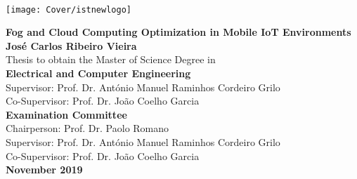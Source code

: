 \setcounter{page}{1} 


\thispagestyle{empty}
\begin{flushleft} ~\\ \vspace{-12mm} \hspace{-12mm}  \texttt{[image: Cover/istnewlogo]}
 \vspace{2.4cm}
\begin{center}
\LARGE \textbf{Fog and Cloud Computing Optimization in Mobile IoT Environments}
\\ \vspace{3.1cm}
\Large \textbf{José Carlos Ribeiro Vieira} \\
\vspace{12mm}
\large Thesis to obtain the Master of Science Degree in
\\ \vspace{2mm}
\LARGE \textbf{Electrical and Computer Engineering}
\\ \vspace{10mm}
\large Supervisor: Prof. Dr. António Manuel Raminhos Cordeiro Grilo \\[6pt]
\large Co-Supervisor: Prof. Dr. João Coelho Garcia
\\ \vspace{15mm}
\Large \textbf{Examination Committee}
\\ \vspace{5mm}
\large Chairperson:	Prof. Dr. Paolo Romano \\[6pt]
\large Supervisor: Prof. Dr. António Manuel Raminhos Cordeiro Grilo \\[6pt]
\large Co-Supervisor: Prof. Dr. João Coelho Garcia\\
\vspace{25mm}
\Large \textbf{November 2019} \\
\end{center}
\let\thepage\relax
\end{flushleft}
\pagebreak


\clearpage

\thispagestyle{empty}
\cleardoublepage

\setcounter{page}{1} 

\baselineskip 18pt %
